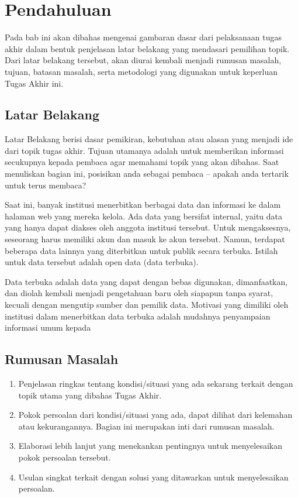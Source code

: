 \chapter{Pendahuluan}

Pada bab ini akan dibahas mengenai gambaran dasar dari pelaksanaan tugas akhir dalam bentuk penjelasan latar belakang yang mendasari pemilihan topik. Dari latar belakang tersebut, akan diurai kembali menjadi rumusan masalah, tujuan, batasan masalah, serta metodologi yang digunakan untuk keperluan Tugas Akhir ini.

\section{Latar Belakang}

Latar Belakang berisi dasar pemikiran, kebutuhan atau alasan yang menjadi ide dari topik tugas akhir. Tujuan utamanya adalah untuk memberikan informasi secukupnya kepada pembaca agar memahami topik yang akan dibahas.  Saat menuliskan bagian ini, posisikan anda sebagai pembaca – apakah anda tertarik untuk terus membaca?

Saat ini, banyak institusi menerbitkan berbagai data dan informasi ke dalam halaman web yang mereka kelola. Ada data yang bersifat internal, yaitu data yang hanya dapat diakses oleh anggota institusi tersebut. Untuk mengaksesnya, seseorang harus memiliki akun dan masuk ke akun tersebut. Namun, terdapat beberapa data lainnya yang diterbitkan untuk publik secara terbuka. Istilah untuk data tersebut adalah open data (data terbuka).

Data terbuka adalah data yang dapat dengan bebas digunakan, dimanfaatkan, dan diolah kembali menjadi pengetahuan baru oleh siapapun tanpa syarat, kecuali dengan mengutip sumber dan pemilik data. Motivasi yang dimiliki oleh institusi dalam menerbitkan data terbuka adalah mudahnya penyampaian informasi umum kepada 

\section{Rumusan Masalah}

\begin{enumerate}
    \item Penjelasan ringkas tentang kondisi/situasi yang ada sekarang terkait dengan topik utama yang dibahas Tugas Akhir.
    \item Pokok persoalan dari kondisi/situasi yang ada, dapat dilihat dari kelemahan atau kekurangannya. Bagian ini merupakan inti dari rumusan masalah.
    \item Elaborasi lebih lanjut yang menekankan pentingnya untuk menyelesaikan pokok persoalan tersebut.
    \item Usulan singkat terkait dengan solusi yang ditawarkan untuk menyelesaikan persoalan.
\end{enumerate}

